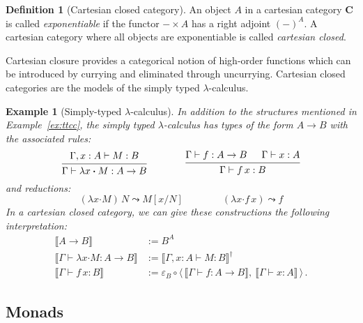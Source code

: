 \documentclass[11pt,oneside,draft]{book}
\newtheorem{example}[theorem]{Example}
\theoremstyle{definition}
\newtheorem{definition}[theorem]{Definition}
\newcommand{\bdot}{\boldsymbol{\cdot}}
\begin{document}
\begin{definition}[Cartesian closed category] \label{def:cc} %
An object $A$ in a cartesian category $\mathbf{C}$
is called \emph{exponentiable}
if the functor ${-} \times A$ has a right adjoint $(-)^A$.
A cartesian category
where all objects are exponentiable
is called \emph{cartesian closed}.
\end{definition}

Cartesian closure provides
a categorical notion of high-order functions
which can be introduced by currying
and eliminated through uncurrying.
Cartesian closed categories are the models
of the simply typed $\lambda$-calculus.

\begin{example}[Simply-typed $\lambda$-calculus] %
In addition to the structures mentioned in Example~\ref{ex:ttcc},
the simply typed $\lambda$-calculus has types of the form
$A \rightarrow B$ with the associated rules:
\[
  \begin{prooftree}
    \hypo{\Gamma, x:A \vdash M : B}
    \infer1{\Gamma \vdash \lambda x \bdot M : A \rightarrow B}
  \end{prooftree}
  \qquad \qquad
  \begin{prooftree}
    \hypo{\Gamma \vdash f : A \rightarrow B}
    \hypo{\Gamma \vdash x : A}
    \infer2{\Gamma \vdash f \, x : B}
  \end{prooftree}
\]
and reductions:
\[
  (\lambda x \bdot M) \, N \leadsto M[x/N]
  \qquad \qquad
  (\lambda x \bdot f \, x) \leadsto f
\]
In a cartesian closed category,
we can give these constructions the following interpretation:
\begin{align*}
  \llbracket A \rightarrow B \rrbracket &:= B^A \\
  \llbracket \Gamma \vdash \lambda x \bdot M : A \rightarrow B \rrbracket
    &:= \llbracket \Gamma, x:A \vdash M : B \rrbracket^\dagger \\
  \llbracket \Gamma \vdash f \, x : B \rrbracket &:=
    \varepsilon_B \circ
    \langle \,
      \llbracket \Gamma \vdash f : A \rightarrow B \rrbracket , \:
      \llbracket \Gamma \vdash x : A \rrbracket
    \, \rangle
  \,.
\end{align*}
\end{example}


\subsection{Monads} \label{sec:freemon} %
\end{document}
